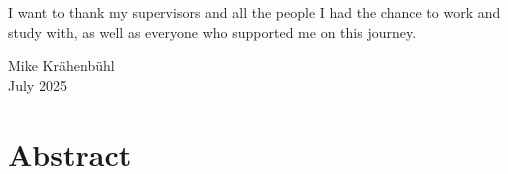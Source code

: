 \documentclass[11pt,a4paper,twoside]{book}
\begin{document}
I want to thank my supervisors and all the people I had the chance to work and study with, as well as everyone who supported me on this journey.

% 
% 
% 


\bigskip

\begin{flushright}
  Mike Kr{\"a}henb{\"u}hl\\
  July 2025
\end{flushright}


\cleardoublepage





\chapter*{Abstract}
\thispagestyle{plain}
\end{document}
